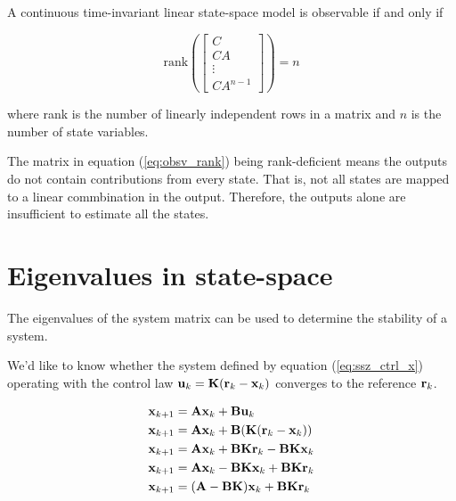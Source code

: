 \begin{theorem}[Observability]
  A continuous \gls{time-invariant} linear state-space \gls{model} is observable
  if and only if

  \begin{equation}
    \text{rank} \left(
    \begin{bmatrix}
      C \\
      CA \\
      \vdots \\
      CA^{n-1}
    \end{bmatrix}\right) = n \label{eq:obsv_rank}
  \end{equation}

  where rank is the number of linearly independent rows in a matrix and $n$ is
  the number of \gls{state} variables.
\end{theorem}

The matrix in equation (\ref{eq:obsv_rank}) being rank-deficient means the
outputs do not contain contributions from every state. That is, not all states
are mapped to a linear commbination in the output. Therefore, the outputs alone
are insufficient to estimate all the states.

\section{Eigenvalues in state-space}

The eigenvalues of the system matrix can be used to determine the stability of a
\gls{system}.

We'd like to know whether the \gls{system} defined by equation
(\ref{eq:ssz_ctrl_x}) operating with the \gls{control law}
$\mathbf{u}_k = \mathbf{K}(\mathbf{r}_k - \mathbf{x}_k)$ converges to the \gls{reference}
$\mathbf{r}_k$.

\begin{align}
  \mathbf{x}_{k+1} &= \mathbf{A}\mathbf{x}_k + \mathbf{B}\mathbf{u}_k \nonumber \\
  \mathbf{x}_{k+1} &= \mathbf{A}\mathbf{x}_k + \mathbf{B}(\mathbf{K}(\mathbf{r}_k - \mathbf{x}_k))
    \nonumber \\
  \mathbf{x}_{k+1} &= \mathbf{A}\mathbf{x}_k + \mathbf{B}\mathbf{K}\mathbf{r}_k -
    \mathbf{B}\mathbf{K}\mathbf{x}_k \nonumber \\
  \mathbf{x}_{k+1} &= \mathbf{A}\mathbf{x}_k - \mathbf{B}\mathbf{K}\mathbf{x}_k +
    \mathbf{B}\mathbf{K}\mathbf{r}_k \nonumber \\
  \mathbf{x}_{k+1} &= (\mathbf{A} - \mathbf{B}\mathbf{K})\mathbf{x}_k +
    \mathbf{B}\mathbf{K}\mathbf{r}_k \label{eq:ctrl_eig_calc}
\end{align}

